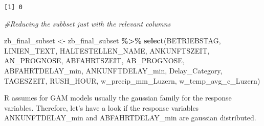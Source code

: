 \documentclass[
]{article}
\newenvironment{Shaded}{\begin{snugshade}}{\end{snugshade}}
\newcommand{\AttributeTok}[1]{\textcolor[rgb]{0.13,0.29,0.53}{#1}}
\newcommand{\CommentTok}[1]{\textcolor[rgb]{0.56,0.35,0.01}{\textit{#1}}}
\newcommand{\DecValTok}[1]{\textcolor[rgb]{0.00,0.00,0.81}{#1}}
\newcommand{\FunctionTok}[1]{\textcolor[rgb]{0.13,0.29,0.53}{\textbf{#1}}}
\newcommand{\NormalTok}[1]{#1}
\newcommand{\OtherTok}[1]{\textcolor[rgb]{0.56,0.35,0.01}{#1}}
\newcommand{\SpecialCharTok}[1]{\textcolor[rgb]{0.81,0.36,0.00}{\textbf{#1}}}
\newcommand{\StringTok}[1]{\textcolor[rgb]{0.31,0.60,0.02}{#1}}
\begin{document}
\begin{Shaded}
\end{Shaded}

\begin{verbatim}
[1] 0
\end{verbatim}

\begin{Shaded}
\begin{Highlighting}[]
\CommentTok{\#Reducing the subbset just with the relevant columns}

\NormalTok{zb\_final\_subset }\OtherTok{\textless{}{-}}\NormalTok{ zb\_final\_subset }\SpecialCharTok{\%\textgreater{}\%} \FunctionTok{select}\NormalTok{(BETRIEBSTAG, LINIEN\_TEXT, HALTESTELLEN\_NAME, ANKUNFTSZEIT, AN\_PROGNOSE, ABFAHRTSZEIT, AB\_PROGNOSE, ABFAHRTDELAY\_min, ANKUNFTDELAY\_min, Delay\_Category, TAGESZEIT, RUSH\_HOUR, w\_precip\_mm\_Luzern, w\_temp\_avg\_c\_Luzern)}
\end{Highlighting}
\end{Shaded}

R assumes for GAM models usually the gaussian family for the response
variables. Therefore, let's have a look if the response variables
ANKUNFTDELAY\_min and ABFAHRTDELAY\_min are gaussian distributed.

\begin{Shaded}
\end{Shaded}
\end{document}
